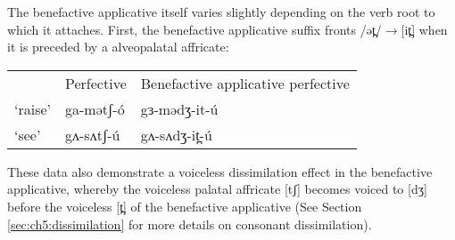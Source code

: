 

 
%
%
%

%

The benefactive applicative itself varies slightly depending on the verb root to which it attaches. First, the benefactive applicative suffix fronts /ət̪/$\to$[it̪] when it is preceded by a alveopalatal affricate:
\ea
\begin{tabular}[t]{lll}
&	Perfective	&	Benefactive applicative perfective\\
‘raise’ 		& ga-mətʃ-ó		&	gɜ-mədʒ-it-ú\\
‘see’	&	gʌ-sʌtʃ-ú		& 	gʌ-sʌdʒ-it̪-ú	\\
\end{tabular}
\z

These data also demonstrate a voiceless dissimilation effect in the benefactive applicative, whereby the voiceless palatal affricate [tʃ] becomes voiced to [dʒ] before the voiceless [t̪] of the benefactive applicative (See Section \ref{sec:ch5:dissimilation} for more details on consonant dissimilation). 

